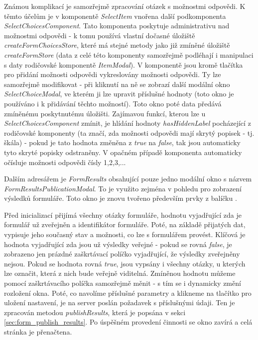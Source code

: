 			Známou komplikací je samozřejmě zpracování otázek s možnostmi odpovědi. K těmto účelům je v komponentě \textit{SelectItem} vnořena další podkomponenta \textit{SelectChoicesComponent}. Tato komponenta poskytuje administrativu nad možnostmi odpovědi - k tomu používá vlastní dočasné úložiště \textit{createFormChoicesStore}, které má stejné metody jako již zmíněné úložiště \textit{createFormStore} (data z celé této komponenty samozřejmě podléhají i manipulaci s daty rodičovské komponentě \textit{ItemModal}). V komponentě jsou kromě tlačítka pro přidání možnosti odpovědi vykreslovány možnosti odpovědi. Ty lze samozřejmě modifikovat - při kliknutí na ně se zobrazí další modální okno \textit{SelectChoiceModal}, ve kterém ji lze upravit příslušné hodnoty (toto okno je používáno i k přidávání těchto možností). Toto okno poté data předává zmíněnému poskytnutému úložišti. Zajímavou funkcí, kterou lze u \textit{SelectChoicesComponent} zmínit, je hlídání hodnoty \textit{hasHiddenLabel} pocházející z rodičovské komponenty (ta značí, zda možnosti odpovědi mají skrytý popisek - tj. škála) - pokud je tato hodnota změněna z \textit{true} na \textit{false}, tak jsou automaticky tyto skryté popisky odstraněny. V opačném případě komponenta automaticky očísluje možnosti odpovědi čísly 1,2,3,...
			
			\label{sec:modalni_okna_vysledky_form}
			Dalším adresářem je \textit{FormResults} obsahující pouze jedno modální okno s názvem \textit{FormResultsPublicationModal}. To je využito zejména v pohledu pro zobrazení výsledků formuláře. Toto okno je znovu tvořeno především prvky z balíčku . 
			
			Před inicializací přijímá všechny otázky formuláře, hodnotu vyjadřující zda je formulář už zveřejněn a identifikátor formuláře. Poté, na základě přijatých dat, vypisuje jeho současný stav a možnosti, co lze s formulářem provést. Klíčová je hodnota vyjadřující zda jsou už výsledky veřejné - pokud se rovná \textit{false}, je zobrazeno jen prázdné zaškrtávací políčko vyjadřující, že výsledky zveřejněny nejsou. Pokud se hodnota rovná \textit{true}, jsou vypsány i všechny otázky, u kterých lze označit, která z nich bude veřejně viditelná. Zmíněnou hodnotu můžeme pomocí zaškrtávacího políčka samozřejmě měnit - s tím se i dynamicky změní rozložení okna. Poté, co navolíme příslušné parametry a klikneme na tlačítko pro uložení nastavení, je na server poslán požadavek s příslušnými údaji. Ten je zpracován metodou \textit{publishResults}, která je popsána v sekci \ref{sec:form_publish_results}. Po úspěšném provedení činnosti se okno zavírá a celá stránka je přenačtena.
			
